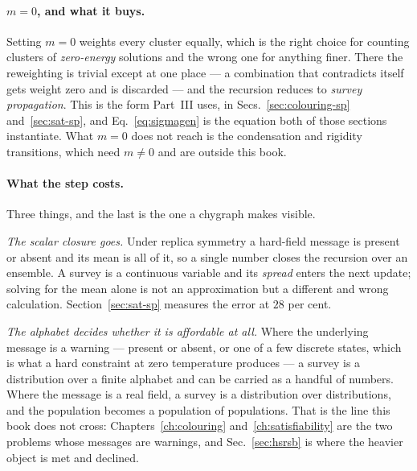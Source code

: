 \paragraph{$m=0$, and what it buys.} Setting $m=0$ weights every cluster
equally, which is the right choice for counting clusters of \emph{zero-energy}
solutions and the wrong one for anything finer. There the reweighting is trivial
except at one place --- a combination that contradicts itself gets weight zero
and is discarded --- and the recursion reduces to \emph{survey propagation}.
This is the form Part~III uses, in Secs.~\ref{sec:colouring-sp}
and~\ref{sec:sat-sp}, and Eq.~\eqref{eq:sigmagen} is the equation both of those
sections instantiate. What $m=0$ does not reach is the condensation and rigidity
transitions, which need $m\ne0$ and are outside this book.

\paragraph{What the step costs.} Three things, and the last is the one a
chygraph makes visible.

\emph{The scalar closure goes.} Under replica symmetry a hard-field message is
present or absent and its mean is all of it, so a single number closes the
recursion over an ensemble. A survey is a continuous variable and its
\emph{spread} enters the next update; solving for the mean alone is not an
approximation but a different and wrong calculation.
Section~\ref{sec:sat-sp} measures the error at $28$ per cent.

\emph{The alphabet decides whether it is affordable at all.} Where the
underlying message is a warning --- present or absent, or one of a few discrete
states, which is what a hard constraint at zero temperature produces --- a
survey is a distribution over a finite alphabet and can be carried as a handful
of numbers. Where the message is a real field, a survey is a distribution over
distributions, and the population becomes a population of populations. That is
the line this book does not cross: Chapters~\ref{ch:colouring}
and~\ref{ch:satisfiability} are the two problems whose messages are warnings,
and Sec.~\ref{sec:hsrsb} is where the heavier object is met and declined.

